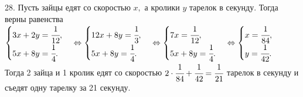 28. Пусть зайцы едят со скоростью $x,$ а кролики $y$ тарелок в секунду. Тогда верны равенства\\
$\begin{cases}3x+2y=\cfrac{1}{12},\\ 5x+8y=\cfrac{1}{4}.\end{cases}\Leftrightarrow
\begin{cases}12x+8y=\cfrac{1}{3},\\ 5x+8y=\cfrac{1}{4}.\end{cases}\Leftrightarrow
\begin{cases}7x=\cfrac{1}{12},\\ 5x+8y=\cfrac{1}{4}.\end{cases}\Leftrightarrow
\begin{cases} x=\cfrac{1}{84},\\ y=\cfrac{1}{42}.\end{cases}$
Тогда 2 зайца и 1 кролик едят со скоростью $2\cdot\cfrac{1}{84}+\cfrac{1}{42}=\cfrac{1}{21}$ тарелок в секунду и съедят одну тарелку за 21 секунду.\\

